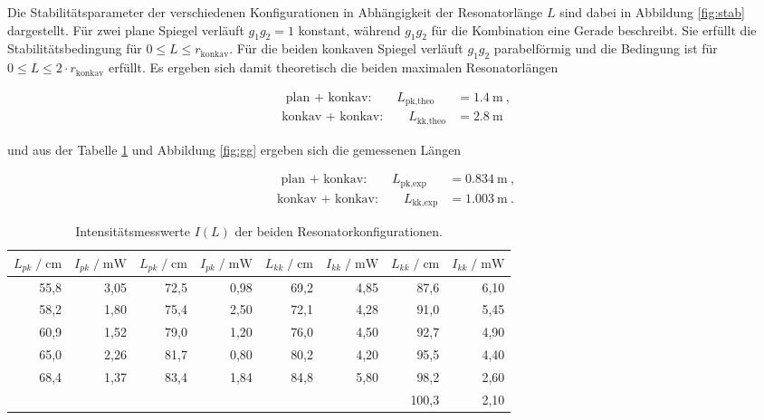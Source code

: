 Die Stabilitätsparameter der verschiedenen Konfigurationen in Abhängigkeit der Resonatorlänge $L$ 
sind dabei in Abbildung \ref{fig:stab} dargestellt.
Für zwei plane Spiegel verläuft $g_1 g_2 = 1$ konstant, während $g_1 g_2$ für die Kombination eine Gerade 
beschreibt. Sie erfüllt die Stabilitätsbedingung für $0 \leq L \leq r_\text{konkav}$. Für
die beiden konkaven Spiegel verläuft $g_1 g_2$ parabelförmig und die Bedingung ist für  $0 \leq L \leq 2 \cdot r_\text{konkav}$
erfüllt. Es ergeben sich damit theoretisch die beiden maximalen Resonatorlängen

\vspace{-15pt}
\begin{align*}
    \text{  plan + konkav:} \qquad L_\text{pk,theo} &= \SI{1.4}{\meter} \: ,\\
    \text{konkav + konkav:} \qquad L_\text{kk,theo} &= \SI{2.8}{\meter}
\end{align*}

und aus der Tabelle \ref{tab:gg} und Abbildung \ref{fig:gg} ergeben sich die gemessenen Längen

\vspace{-15pt}
\begin{align*}
    \text{  plan + konkav:} \qquad L_\text{pk,exp} &= \SI{0.834}{\meter} \: ,\\
    \text{konkav + konkav:} \qquad L_\text{kk,exp} &= \SI{1.003}{\meter} \: .
\end{align*}

\begin{table}[H]
    \centering
    \footnotesize
    \caption{Intensitätsmesswerte $I(L)$ der beiden Resonatorkonfigurationen.}
    \label{tab:gg}
    \begin{tabular}{r r r r | r r r r}
    \toprule
    $L_{pk} \;/\; \si{\centi\meter}$ & $I_{pk} \;/\; \si{\milli\watt}$ & 
    $L_{pk} \;/\; \si{\centi\meter}$ & $I_{pk} \;/\; \si{\milli\watt}$ &
    $L_{kk} \;/\; \si{\centi\meter}$ & $I_{kk} \;/\; \si{\milli\watt}$ & 
    $L_{kk} \;/\; \si{\centi\meter}$ & $I_{kk} \;/\; \si{\milli\watt}$ \\
    \midrule
    55,8 & 3,05 & 72,5 & 0,98 & 69,2 & 4,85 &  87,6 & 6,10 \\
    58,2 & 1,80 & 75,4 & 2,50 & 72,1 & 4,28 &  91,0 & 5,45 \\
    60,9 & 1,52 & 79,0 & 1,20 & 76,0 & 4,50 &  92,7 & 4,90 \\
    65,0 & 2,26 & 81,7 & 0,80 & 80,2 & 4,20 &  95,5 & 4,40 \\
    68,4 & 1,37 & 83,4 & 1,84 & 84,8 & 5,80 &  98,2 & 2,60 \\  
         &      &      &      &      &      & 100,3 & 2,10 \\
    \bottomrule
    \end{tabular}
\end{table}


